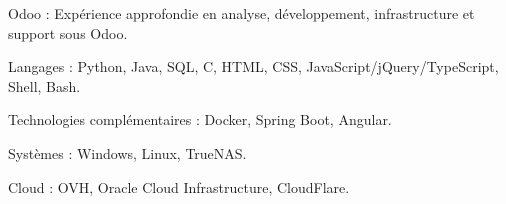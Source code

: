 \begin{indentsection}{\parindent}
  \begin{description*}
    \item[Odoo :] Expérience approfondie en analyse, développement, infrastructure et support sous Odoo.
    \item[Langages :] Python, Java, SQL, C, HTML, CSS, JavaScript/jQuery/TypeScript, Shell, Bash.
    \item[Technologies complémentaires :] Docker, Spring Boot, Angular.
    \item[Systèmes :] Windows, Linux, TrueNAS.
    \item[Cloud :] OVH, Oracle Cloud Infrastructure, CloudFlare.

  \end{description*}
\end{indentsection}
